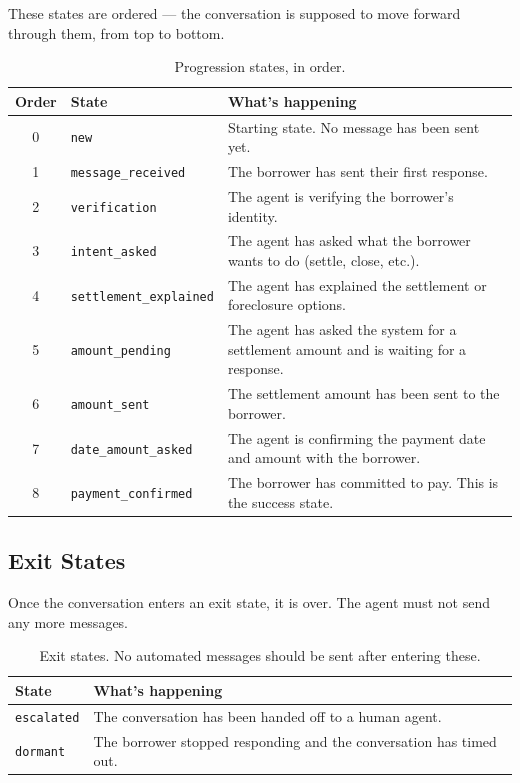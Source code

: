 \documentclass[11pt, a4paper]{article}
\begin{document}
These states are ordered --- the conversation is supposed to move forward through them, from top to bottom.

\begin{table}[h]
\centering
\begin{tabular}{clp{8cm}}
\toprule
\textbf{Order} & \textbf{State} & \textbf{What's happening} \\
\midrule
0 & \texttt{new} & Starting state. No message has been sent yet. \\
1 & \texttt{message\_received} & The borrower has sent their first response. \\
2 & \texttt{verification} & The agent is verifying the borrower's identity. \\
3 & \texttt{intent\_asked} & The agent has asked what the borrower wants to do (settle, close, etc.). \\
4 & \texttt{settlement\_explained} & The agent has explained the settlement or foreclosure options. \\
5 & \texttt{amount\_pending} & The agent has asked the system for a settlement amount and is waiting for a response. \\
6 & \texttt{amount\_sent} & The settlement amount has been sent to the borrower. \\
7 & \texttt{date\_amount\_asked} & The agent is confirming the payment date and amount with the borrower. \\
8 & \texttt{payment\_confirmed} & The borrower has committed to pay. This is the success state. \\
\bottomrule
\end{tabular}
\caption{Progression states, in order.}
\label{tab:states}
\end{table}

\subsection{Exit States}

Once the conversation enters an exit state, it is over. The agent must not send any more messages.

\begin{table}[h]
\centering
\begin{tabular}{lp{10cm}}
\toprule
\textbf{State} & \textbf{What's happening} \\
\midrule
\texttt{escalated} & The conversation has been handed off to a human agent. \\
\texttt{dormant} & The borrower stopped responding and the conversation has timed out. \\
\bottomrule
\end{tabular}
\caption{Exit states. No automated messages should be sent after entering these.}
\label{tab:terminal}
\end{table}
\end{document}

